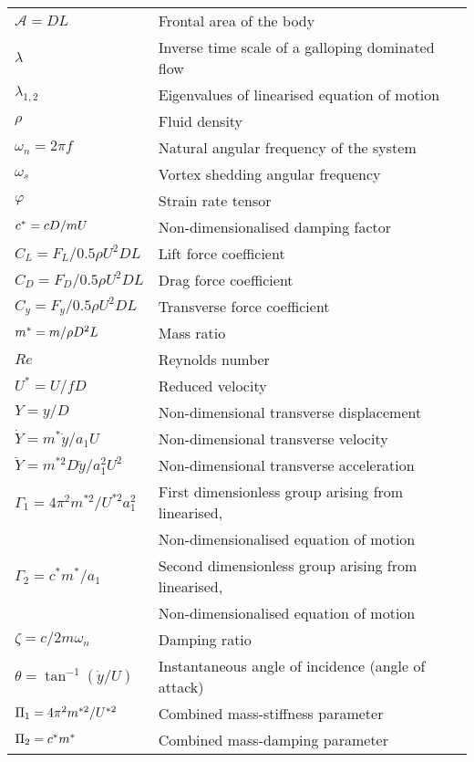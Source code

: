 \begin{longtable}{p{}p{}}
$\mathcal{A}=DL$ & Frontal area of the body\\ 
$\lambda$ & Inverse time scale of a galloping dominated flow \\
$\lambda_{1,2}$ & Eigenvalues of linearised equation of motion \\
$\rho$ & Fluid density  \\
$\omega_n= 2 \pi f$ & Natural angular frequency of the system  \\
$\omega_s$ & Vortex shedding angular frequency \\
$\varphi$ & Strain rate tensor \\
$c^{*}=cD/mU$ & Non-dimensionalised damping factor \\
$C_L=F_L/0.5\rho U^2DL$ & Lift force coefficient \\
$C_D=F_D/0.5\rho U^2DL$ & Drag force coefficient \\
$C_y=F_y/0.5\rho U^2DL$ & Transverse force coefficient \\
$m^{*}=m/\rho D^2L$ & Mass ratio \\
$Re$ & Reynolds number  \\
$U^*=U/fD$ & Reduced velocity  \\
$Y=y/D$ & Non-dimensional transverse displacement \\
$\dot{Y}=m^*\dot{y}/a_1U$ & Non-dimensional transverse velocity \\
$\ddot{Y}=m^{*2}D\ddot{y}/a_1^2U^2$ & Non-dimensional transverse acceleration \\
$\Gamma_1 = 4\pi^2m^{*2}/U^{*2}a_1^2$ & First dimensionless group arising from linearised,\\ 
& Non-dimensionalised equation of motion\\
$\Gamma_2 = c^*m^*/a_1$ & Second dimensionless group arising from linearised,\\
& Non-dimensionalised equation of motion \\
$\zeta= c/2 m \omega_n$ & Damping ratio \\
$\theta= \tan^{-1}{(\dot{y}/U)}$ & Instantaneous angle of incidence (angle of attack)\\
$\Pi_1 =  4\pi^2m^{*2}/U^{*2}$ & Combined mass-stiffness parameter\\
$\Pi_2 = c^*m^*$ & Combined mass-damping parameter\\
\end{longtable} 